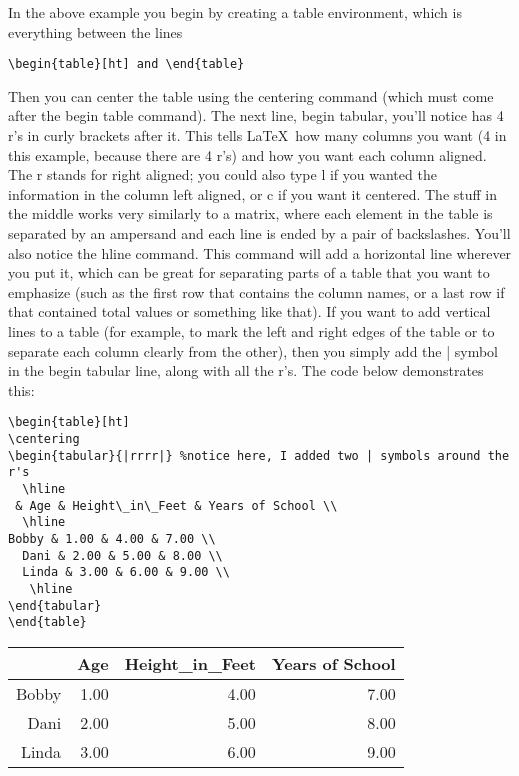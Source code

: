 \documentclass{article}
\begin{document}
In the above example you begin by creating a table environment, which is everything between the lines \begin{verbatim}\begin{table}[ht] and \end{table} \end{verbatim}
Then you can center the table using the centering command (which must come after the begin table command). The next line, begin tabular, you'll notice has 4 r's in curly brackets after it. This tells \LaTeX~how many columns you want (4 in this example, because there are 4 r's) and how you want each column aligned. The r stands for right aligned; you could also type l if you wanted the information in the column left aligned, or c if you want it centered. The stuff in the middle works very similarly to a matrix, where each element in the table is separated by an ampersand and each line is ended by a pair of backslashes.
You'll also notice the hline command. This command will add a horizontal line wherever you put it, which can be great for separating parts of a table that you want to emphasize (such as the first row that contains the column names, or a last row if that contained total values or something like that). If you want to add vertical lines to a table (for example, to mark the left and right edges of the table or to separate each column clearly from the other), then you simply add the | symbol in the begin tabular line, along with all the r's. The code below demonstrates this:
\begin{verbatim}
\begin{table}[ht]
\centering
\begin{tabular}{|rrrr|} %notice here, I added two | symbols around the r's
  \hline
 & Age & Height\_in\_Feet & Years of School \\ 
  \hline
Bobby & 1.00 & 4.00 & 7.00 \\ 
  Dani & 2.00 & 5.00 & 8.00 \\ 
  Linda & 3.00 & 6.00 & 9.00 \\ 
   \hline
\end{tabular}
\end{table}
\end{verbatim}

\begin{table}[ht]
\centering
\begin{tabular}{|rrrr|} %
  \hline
 & Age & Height\_in\_Feet & Years of School \\ 
  \hline
Bobby & 1.00 & 4.00 & 7.00 \\ 
  Dani & 2.00 & 5.00 & 8.00 \\ 
  Linda & 3.00 & 6.00 & 9.00 \\ 
   \hline
\end{tabular}
\end{table}
\end{document}
